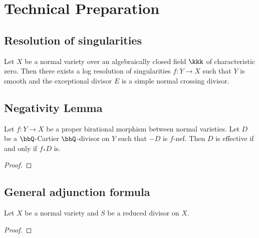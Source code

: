 \section{Technical Preparation}

\subsection{Resolution of singularities}

    \begin{theorem}\label{thm:log_resolution_in_characteristic_zero_for_varieties}
        Let \(X\) be a normal variety over an algebraically closed field \(\kkk\) of characteristic zero.
        Then there exists a log resolution of singularities \(f: Y \to X\) such that \(Y\) is smooth and the exceptional divisor \(E\) is a simple normal crossing divisor.
    \end{theorem}

\subsection{Negativity Lemma}

    \begin{theorem}\label{thm:negativity_lemma}
        Let \(f: Y \to X\) be a proper birational morphism between normal varieties.
        Let \(D\) be a \(\bbQ\)-Cartier \(\bbQ\)-divisor on \(Y\) such that \(-D\) is \(f\)-nef.
        Then \(D\) is effective if and only if \(f_*D\) is.
    \end{theorem}
    \begin{proof}
    \end{proof}

\subsection{General adjunction formula}

    \begin{theorem}\label{thm:general_adjuction_formula}
        Let \(X\) be a normal variety and \(S\) be a reduced divisor on \(X\).
    \end{theorem}
    \begin{proof}
    \end{proof}

